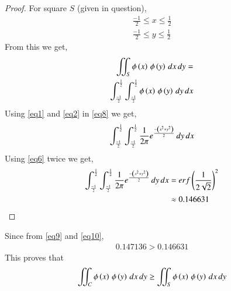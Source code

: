 \documentclass[journal,12pt,twocolumn]{IEEEtran}
\begin{document}
\begin{proof}
For square $S$ (given in question),
\begin{align}
    \frac{-1}{2}\leq x \leq \frac{1}{2}\\
    \frac{-1}{2}\leq y \leq \frac{1}{2}
\end{align}
From this we get,
\begin{align}
    \iint_S{\phi\left(x\right)\,\phi\left(y\right)\,dx\,dy} = \nonumber\\
    \int_{\frac{-1}{2}}^{\frac{1}{2}} \int_{\frac{-1}{2}}^{\frac{1}{2}} \phi\left(x\right)\,\phi\left(y\right)\,dy\,dx \label{eq8}
\end{align}
Using \eqref{eq1} and \eqref{eq2} in \eqref{eq8} we get,
\begin{align}
    \int_{\frac{-1}{2}}^{\frac{1}{2}} \int_{\frac{-1}{2}}^{\frac{1}{2}}\frac{1}{2\pi}e^\frac{-\left(x^2+y^2\right)}{2}\,dy\,dx
\end{align}
Using \eqref{eq6} twice we get,
\begin{align}
    \int_{\frac{-1}{2}}^{\frac{1}{2}} \int_{\frac{-1}{2}}^{\frac{1}{2}}\frac{1}{2\pi}e^\frac{-\left(x^2+y^2\right)}{2}\,dy\,dx &= erf\left(\frac{1}{2\sqrt{2}}\right)^2\\
    &\approx 0.146631
\end{align}
\end{proof}
\begin{solution}
Since from \eqref{eq9} and \eqref{eq10},
\begin{align}
    0.147136 > 0.146631
\end{align}
This proves that 
\begin{align}
     \iint_C{\phi\left(x\right)\,\phi\left(y\right)\,dx\,dy} \geq \iint_S{\phi\left(x\right)\,\phi\left(y\right)\,dx\,dy}
\end{align}
\end{solution}
\end{document}
